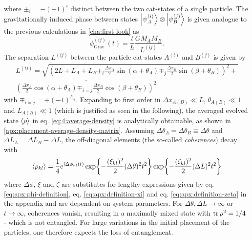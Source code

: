 where $\pm_i = -(-1)^{i}$ distinct between the two cat-states of a single particle.
The gravitationally induced phase between states $\ket{\psi^{(i)}_A}\otimes\ket{\psi^{(j)}_B}$ is given analogue to the previous calculations in \cref{cha:first-look} as
\begin{equation}\label{eq:4:phi-grav}
  \phi^{(ij)}_\mathrm{Grav}(t) = \frac{t}{\hbar} \frac{G M_A M_B}{L^{(ij)}} .
\end{equation}
The separation $L^{(ij)}$ between the particle cat-states $A^{(i)}$ and $B^{(j)}$ is given by
\begin{multline}\label{eq:4:L-gravity}
  L^{(ij)} = \sqrt{\left(2L + L_A + L_B \pm_i \frac{\Delta x_A}{2}\sin(\alpha + \theta_A) \mp_j \frac{\Delta x_B}{2}\sin(\beta + \theta_B)\right)^2 +} \\ \overline{\left(\frac{\Delta x_A}{2}\cos(\alpha + \theta_A) \mp_{i=j} \frac{\Delta x_B}{2}\cos(\beta + \theta_B)\right)^2}
\end{multline}
with $\mp_{i=j} = +(-1)^{\delta_{ij}}$.
Expanding to first order in $\Delta x_{A(B)} \ll L$, $\theta_{A(B)} \ll 1$ and $L_{A(B)} \ll 1$ (which is justified as seen in the following), the averaged evolved state 
$\left\langle\rho\right\rangle$ in eq. \eqref{eq:4:average-density} is analytically obtainable, as shown in \cref{apx:placement-average-density-matrix}.
Assuming $\Delta \theta_A = \Delta \theta_B \equiv \Delta\theta$ and $\Delta L_A = \Delta L_B \equiv \Delta L$, the off-diagonal elements (the so-called \textit{coherences}) decay with
\begin{equation}\label{eq:4:average-density-element}
  \left\langle\rho_{kl}\right\rangle = \frac{1}{4} e^{i \Delta \phi_{kl}(t)} \exp{-\frac{(\xi_{kl})^2}{2} (\Delta\theta)^2 t^2} \exp{-\frac{(\zeta_{kl})^2}{2} (\Delta L)^2 t^2}
\end{equation}
where $\Delta \phi$, $\xi$ and $\zeta$ are substitutes for lengthy expressions given by eq. \eqref{eq:apx:phi-definition}, eq. \eqref{eq:apx:definition-xi} and eq. \eqref{eq:apx:definition-zeta} in the appendix and are dependent on system parameters.
For $\Delta \theta, \Delta L \rightarrow \infty$ or $t\rightarrow \infty$, coherences vanish, resulting in a maximally mixed state with $\tr\rho^2 = 1/4$ - which is not entangled.
For large variations in the initial placement of the particles, one therefore expects the loss of entanglement.

